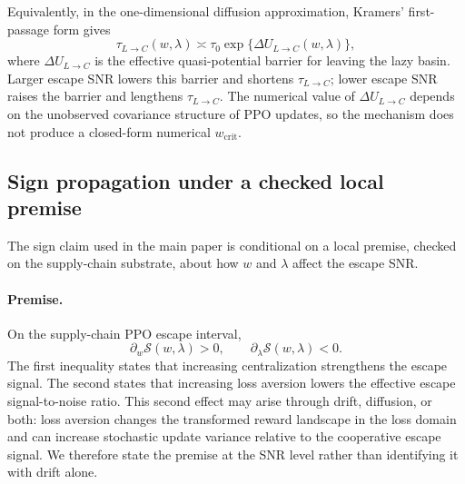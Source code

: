 \documentclass[letterpaper]{article} %
\theoremstyle{plain}
\newcommand{\wcrit}{w_{\mathrm{crit}}}
\begin{document}
Equivalently, in the one-dimensional diffusion approximation, Kramers' first-passage form gives
\begin{equation}
 \tau_{L\to C}(w,\lambda)
 \asymp
 \tau_0
 \exp\{\Delta U_{L\to C}(w,\lambda)\},
 \label{eq:barrier}
\end{equation}
where $\Delta U_{L\to C}$ is the effective quasi-potential barrier for leaving the lazy basin.
Larger escape SNR lowers this barrier and shortens $\tau_{L\to C}$; lower escape SNR raises the
barrier and lengthens $\tau_{L\to C}$. The numerical value of $\Delta U_{L\to C}$ depends on the
unobserved covariance structure of PPO updates, so the mechanism does not produce a closed-form
numerical $\wcrit$.

\subsection{Sign propagation under a checked local premise}
The sign claim used in the main paper is conditional on a local premise, checked on the
supply-chain substrate, about how $w$ and $\lambda$ affect the escape SNR.

\paragraph{Premise.}
On the supply-chain PPO escape interval,
\begin{equation}
 \partial_w \mathcal{S}(w,\lambda)>0,\qquad
 \partial_\lambda \mathcal{S}(w,\lambda)<0.
\end{equation}
The first inequality states that increasing centralization strengthens the escape signal. The
second states that increasing loss aversion lowers the effective escape signal-to-noise ratio. This
second effect may arise through drift, diffusion, or both: loss aversion changes the transformed
reward landscape in the loss domain and can increase stochastic update variance relative to the
cooperative escape signal. We therefore state the premise at the SNR level rather than identifying
it with drift alone.
\end{document}
